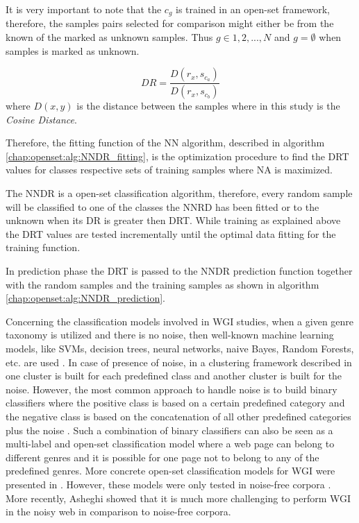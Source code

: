 It is very important to note that the $c_{g}$ is trained in an open-set framework, therefore, the samples pairs selected for comparison might either be from the known of the marked as unknown samples. Thus $g \in {1,2,...,N}$ and $g = \emptyset$ when samples is marked as unknown.

\begin{equation} \label{eq:DR}
    DR = \frac{D(r_{x}, s_{c_{a}})}{D(r_{x}, s_{c_{b}})}
\end{equation}
\noindent
where $D(x,y)$ is the distance between the samples where in this study is the \textit{Cosine Distance}.

Therefore, the fitting function of the NN algorithm, described in algorithm \ref{chap:openset:alg:NNDR_fitting}, is the optimization procedure to find the DRT values for classes respective sets of training samples where NA is maximized.

The NNDR is a open-set classification algorithm, therefore, every random sample will be classified to one of the classes the NNRD has been fitted or to the unknown when its DR is greater then DRT. While training as explained above the DRT values are tested incrementally until the optimal data fitting for the training function.

In prediction phase the DRT is passed to the NNDR prediction function together with the random samples and the training samples as shown in algorithm \ref{chap:openset:alg:NNDR_prediction}.



Concerning the classification models involved in WGI studies, when a given genre taxonomy is utilized and there is no noise, then well-known machine learning models, like SVMs, decision trees, neural networks, naive Bayes, Random Forests, etc. are used \parencite{Lim2005,santini2007automatic,kanaris2009learning,jebari2015combination,sharoff2010web}. In case of presence of noise, in a clustering framework described in \parencite{kennedy2005automatic} one cluster is built for each predefined class and another cluster is built for the noise. However, the most common approach to handle noise is to build binary classifiers where the positive class is based on a certain predefined category and the negative class is based on the concatenation of all other predefined categories plus the noise \parencite{kennedy2005automatic,dong2006binary,levering2008using}. Such a combination of binary classifiers can also be seen as a multi-label and open-set classification model where a web page can belong to different genres and it is possible for one page not to belong to any of the predefined genres. More concrete open-set classification models for WGI were presented in \parencite{stubbe2007genre,pritsos2013open}. However, these models were only tested in noise-free corpora \parencite{pritsos2015clef}. More recently, Asheghi \parencite{Asheghi2015} showed that it is much more challenging to perform WGI in the noisy web in comparison to noise-free corpora.



